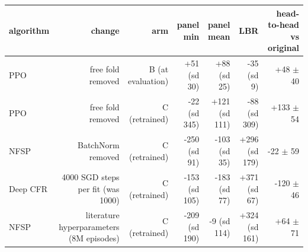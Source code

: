 \begin{tabular}{lrrrrrr}
\toprule
algorithm & change & arm & panel min & panel mean & LBR & head-to-head vs original \\
\midrule
PPO & free fold removed & B (at evaluation) & +51 (sd 30) & +88 (sd 25) & -35 (sd 9) & +48 $\pm$ 40 \\
PPO & free fold removed & C (retrained) & -22 (sd 345) & +121 (sd 111) & -88 (sd 309) & +133 $\pm$ 54 \\
NFSP & BatchNorm removed & C (retrained) & -250 (sd 91) & -103 (sd 35) & +296 (sd 179) & -22 $\pm$ 59 \\
Deep CFR & 4000 SGD steps per fit (was 1000) & C (retrained) & -153 (sd 105) & -183 (sd 77) & +371 (sd 67) & -120 $\pm$ 46 \\
NFSP & literature hyperparameters (8M episodes) & C (retrained) & -209 (sd 190) & -9 (sd 114) & +324 (sd 161) & +64 $\pm$ 71 \\
\bottomrule
\end{tabular}
